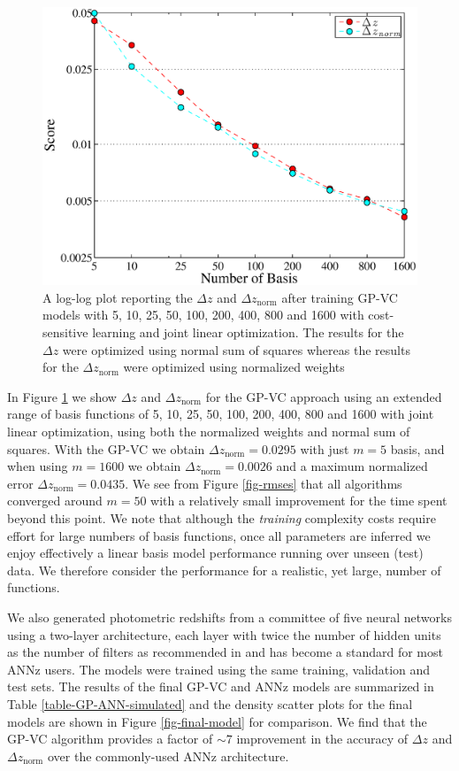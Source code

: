 \documentclass[useAMS,usenatbib,fleqn]{mn2e}
\begin{document}
\begin{figure}
       \centering
       \includegraphics[width=\columnwidth]{figures/1600.eps}
        \caption{A log-log plot reporting the $\Delta z$ and $\Delta z_\textrm{norm}$ after training GP-VC models with 5, 10, 25, 50, 100, 200, 400, 800 and 1600 with cost-sensitive learning and joint linear optimization. The results for the $\Delta z$ were optimized using normal sum of squares whereas the results for the $\Delta z_\textrm{norm}$ were optimized using normalized weights}
       \label{fig-1600}
\end{figure}

In Figure \ref{fig-1600} we show $\Delta z$ and $\Delta z_\textrm{norm}$ for the GP-VC approach using an extended range of basis functions of 5, 10, 25, 50, 100, 200, 400, 800 and 1600 with joint linear optimization, using both the normalized weights and normal sum of squares. With the GP-VC we obtain $\Delta z_\textrm{norm} = 0.0295$ with just $m=5$ basis, and when using $m=1600$ we obtain $\Delta z_\textrm{norm} = 0.0026$ and  a maximum normalized error $\Delta z_\textrm{norm} = 0.0435$. We see from Figure \ref{fig-rmses} that all algorithms converged around $m=50$ with a relatively small improvement for the time spent beyond this point. We note that although the \emph{training} complexity costs require effort for large numbers of basis functions, once all parameters are inferred we enjoy effectively a linear basis model performance running over unseen (test) data. We therefore consider the performance for a realistic, yet large, number of functions. 

We also generated photometric redshifts from a committee of five neural networks using a two-layer architecture, each layer with twice the number of hidden units as the number of filters as recommended in \cite{Collister04} and has become a standard for most {\sc ANNz} users. The models were trained using the same training, validation and test sets. The results of the final GP-VC and {\sc ANNz} models are summarized in Table \ref{table-GP-ANN-simulated} and the density scatter plots for the final models are shown in Figure \ref{fig-final-model} for comparison. We find that the GP-VC algorithm provides a factor of $\sim 7$ improvement in the accuracy of $\Delta z$ and $\Delta z_\textrm{norm}$ over the commonly-used {\sc ANNz} architecture.
\end{document}

